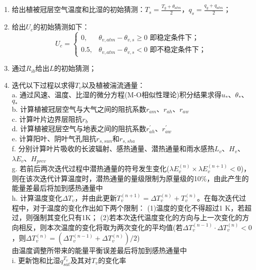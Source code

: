 \begin{enumerate}
    \item 给出植被冠层空气温度和比湿的初始猜测：$T_s=\frac{T_g+\theta_{atm}}{2}$，$q_s=\frac{q_g+q_{atm}}{2}$；
    \item 给出$U_c$的初始猜测如下：\\
    \begin{equation*}
    U_c= \begin{cases}
      0,  & \theta_{v,atm}-\theta_{v,s}\geqslant0 \text{ 即稳定条件下；} \\
      0.5, & \theta_{v,atm}-\theta_{v,s}<0 \text{ 即不稳定条件下；}
     \end{cases}
    \end{equation*}
    \item 通过$R_{ib}$给出$L$的初始猜测；
    \item 迭代以下过程以求得$T_v$以及植被湍流通量：\\
    a. 通过风速、温度、比湿的微分方程(M-O相似性理论)积分结果求得$u_\ast$、$\theta_\ast$、$q_\ast$ \\
    b. 计算植被冠层空气与大气之间的阻抗系数$r_{am}$、$r_{ah}$、$r_{aw}$ \\
    c. 计算叶片边界层阻抗$r_b$ \\
    d. 计算植被冠层空气与地表之间的阻抗系数$r_{ah}^\prime$、$r_{aw}^\prime$ \\
    e. 计算阳叶、阴叶气孔阻抗$r_{s,sun}$和$r_{s,sha}$ \\
    f. 分别计算叶片吸收的长波辐射、感热通量、潜热通量和雨水感热$L_v$、$H_{v}$、$\lambda E_{v}$、$H_{prcv}$ \\
    g. 若前后两次迭代过程中潜热通量的符号发生变化($\lambda E_{v}^{\left(n\right)}\times\lambda E_{v}^{\left(n+1\right)}<0$)，
    则在该次迭代计算温度时，潜热通量的量级限制为原量级的10\%，由此产生的能量差最后将加到感热通量中 \\
    h. 计算温度变化$\Delta T_v$，并由此更新$T_v^{\left(n+1\right)}=\Delta T_v^{\left(n\right)}+T_v^{\left(n\right)}$。在每次迭代过程中，对于温度的变化作出如下两个限制：
    (1)温度的变化不得超过1 K，若超过，则强制其变化只有1K；
    (2)若本次迭代温度变化的方向与上一次变化的方向相反，则本次温度的变化将取为两次变化的平均值(若$\Delta T_v^{\left(n-1\right)} \cdot \Delta T_v^{\left(n\right)}<0$，则$\Delta T_v^{\left(n\right)}=\left(\Delta T_v^{\left(n-1\right)}+\Delta T_v^{\left(n\right)}\right)/2$)\\
    由温度调整所带来的能量平衡误差最后将加到感热通量中\\
    i. 更新饱和比湿$q_{sat}^{T_v}$及其对$T_v$的变化率 \\

\end{enumerate}
